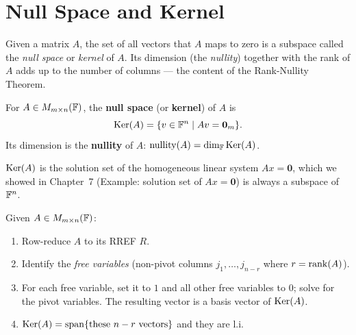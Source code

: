 \section{Null Space and Kernel}
\label{sec:kernel}

Given a matrix $A$, the set of all vectors that $A$ maps to zero is a
subspace called the \emph{null space} or \emph{kernel} of $A$.  Its dimension
(the \emph{nullity}) together with the rank of $A$ adds up to the number of
columns — the content of the Rank-Nullity Theorem.

\begin{defbox}
\label{def:null-space-matrix}
For $A\in M_{m\times n}(\mathbb{F})$, the \textbf{null space} (or \textbf{kernel}) of $A$ is
\[
    \operatorname{Ker}(A) = \{v\in\mathbb{F}^n \mid Av = \mathbf{0}_m\}.
\]
Its dimension is the \textbf{nullity} of $A$:
$\operatorname{nullity}(A) = \operatorname{dim}_{\mathbb{F}}\operatorname{Ker}(A)$.
\end{defbox}

\begin{tipbox}
$\operatorname{Ker}(A)$ is the solution set of the homogeneous linear system $Ax=\mathbf{0}$,
which we showed in Chapter~7 (Example: solution set of $Ax=\mathbf{0}$) is
always a subspace of $\mathbb{F}^n$.
\end{tipbox}

\begin{methodbox}
\label{meth:null-space-basis}
Given $A\in M_{m\times n}(\mathbb{F})$:
\begin{enumerate}
    \item Row-reduce $A$ to its RREF $R$.
    \item Identify the \emph{free variables} (non-pivot columns
          $j_1,\ldots,j_{n-r}$ where $r=\operatorname{rank}(A)$).
    \item For each free variable, set it to $1$ and all other free variables
          to $0$; solve for the pivot variables.  The resulting vector is a
          basis vector of $\operatorname{Ker}(A)$.
    \item $\operatorname{Ker}(A) = \operatorname{span}\{\text{these } n-r \text{ vectors}\}$ and they are l.i.
\end{enumerate}
\end{methodbox}

